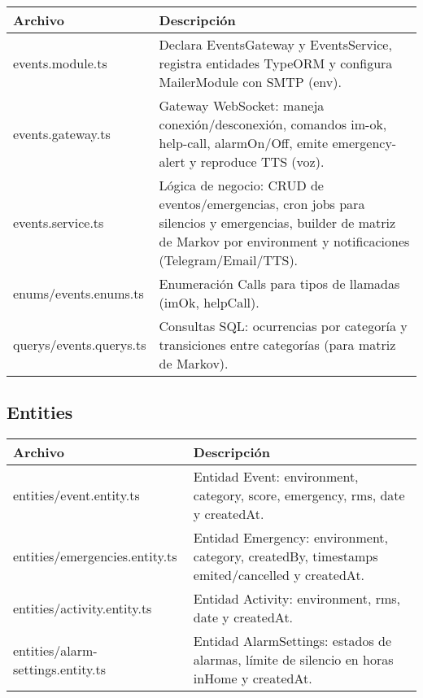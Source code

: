 \begin{table}[H]
  \doublespacing
  \begin{tabularx}{\textwidth}{l X}
    \hline
    \textbf{Archivo}        & \textbf{Descripción}                                                                                                                                                       \\
    \hline
    events.module.ts        & Declara EventsGateway y EventsService, registra entidades TypeORM y configura MailerModule con SMTP (env).                                                                 \\
    events.gateway.ts       & Gateway WebSocket: maneja conexión/desconexión, comandos im-ok, help-call, alarmOn/Off, emite emergency-alert y reproduce TTS (voz).                                       \\
    events.service.ts       & Lógica de negocio: CRUD de eventos/emergencias, cron jobs para silencios y emergencias, builder de matriz de Markov por environment y notificaciones (Telegram/Email/TTS). \\
    enums/events.enums.ts   & Enumeración Calls para tipos de llamadas (imOk, helpCall).                                                                                                                 \\
    querys/events.querys.ts & Consultas SQL: ocurrencias por categoría y transiciones entre categorías (para matriz de Markov).                                                                          \\
    \hline
  \end{tabularx}
\end{table}

\subsection*{Entities}

\begin{table}[H]
  \doublespacing
  \begin{tabularx}{\textwidth}{l X}
    \hline
    \textbf{Archivo}                  & \textbf{Descripción}                                                                          \\
    \hline
    entities/event.entity.ts          & Entidad Event: environment, category, score, emergency, rms, date y createdAt.                \\
    entities/emergencies.entity.ts    & Entidad Emergency: environment, category, createdBy, timestamps emited/cancelled y createdAt. \\
    entities/activity.entity.ts       & Entidad Activity: environment, rms, date y createdAt.                                         \\
    entities/alarm-settings.entity.ts & Entidad AlarmSettings: estados de alarmas, límite de silencio en horas inHome y createdAt.    \\
    \hline
  \end{tabularx}
\end{table}

